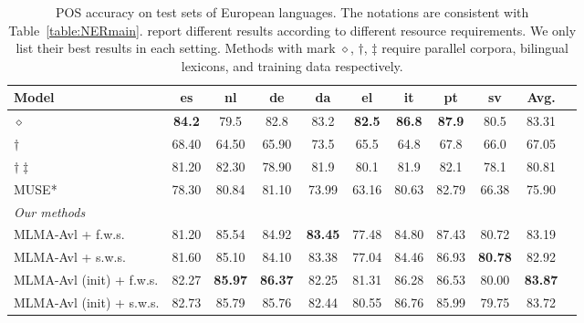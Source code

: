 \documentclass[11pt,a4paper]{article}
\begin{document}
    \begin{table}[th]
		\centering
		\begin{tabular}{l c c c c c c c c c c}%
			Model  & es & nl & de & da & el & it & pt & sv & Avg. \\%
			\hline
			\newcite{das2011unsupervised}$\diamond$ & \textbf{84.2} & 79.5 & 82.8 & 83.2 & \textbf{82.5} & \textbf{86.8} & \textbf{87.9} & 80.5 & 83.31\\%
			\newcite{fang2017model}$\dagger$ & 68.40 & 64.50 & 65.90 & 73.5 & 65.5 & 64.8 & 67.8 & 66.0 & 67.05 \\%
			\newcite{fang2017model}$\dagger\ddagger$ & 81.20 & 82.30 & 78.90 & 81.9 & 80.1 & 81.9 & 82.1 & 78.1 & 80.81\\%
			MUSE* & 78.30  & 80.84  & 81.10  & 73.99  & 63.16  & 80.63  & 82.79  & 66.38 & 75.90\\%
			\hline
			\textit{Our methods} & & & & & & & &\\%
			MLMA-Avl + f.w.s. & 81.20  & 85.54  & 84.92  & \textbf{83.45}  & 77.48  & 84.80  & 87.43  & 80.72 & 83.19 \\%
			MLMA-Avl + s.w.s. & 81.60  & 85.10  & 84.10  & 83.38  & 77.04  & 84.46  & 86.93  & \textbf{80.78} & 82.92 \\%
			MLMA-Avl (init) + f.w.s. & 82.27  & \textbf{85.97}  & \textbf{86.37}  & 82.25  & 81.31  & 86.28   & 86.53  & 80.00 & \textbf{83.87} \\%
			MLMA-Avl (init) + s.w.s. & 82.73  & 85.79  & 85.76  & 82.44  & 80.55  & 86.76  & 85.99  & 79.75 & 83.72 \\%
			\hline
		\end{tabular}
		\caption{ POS accuracy on test sets of European languages. The notations are consistent with Table~\ref{table:NERmain}.  report different results according to different resource requirements. We only list their best results in each setting. Methods with mark $\diamond$, $\dagger$, $\ddagger$ require parallel corpora, bilingual lexicons, and training data respectively.}
		\vspace{-1.5em}
		\label{table:POSmain}
	\end{table}
	
\end{document}
